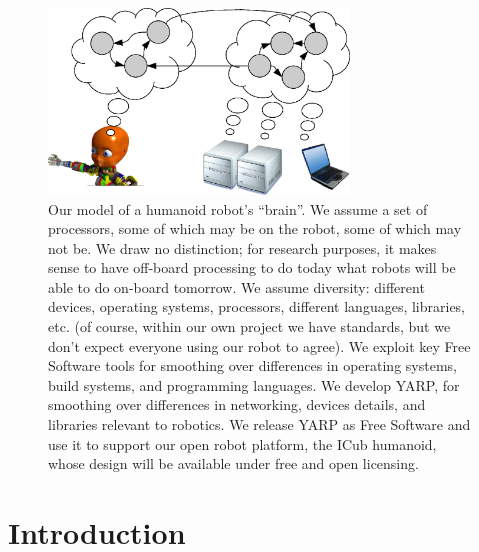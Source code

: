 

\begin{figure}
\centerline{
\includegraphics[width=8cm]{fig-nethead}
}
\caption{
%
Our model of a humanoid robot's ``brain''.
We assume a set of processors, some of which may
be on the robot, some of which may not be. We draw no 
distinction; for research purposes, it makes sense to
have off-board processing to do today what robots will
be able to do on-board tomorrow.
%
We assume diversity:
different devices, operating systems, processors, different languages,
libraries, etc. (of course, within our own project we have standards,
but we don't expect everyone using our robot to agree).
%
%
We exploit key Free Software tools for smoothing over differences in
operating systems, build systems, and programming languages.
%
We develop YARP, for smoothing over differences in networking,
devices details, and libraries relevant to robotics.
%
%
%
%
We release YARP as Free Software
 and use it to support our open robot
platform, the ICub humanoid, whose design will be available under free
and open licensing.
%
}
\end{figure}


\section{Introduction}




